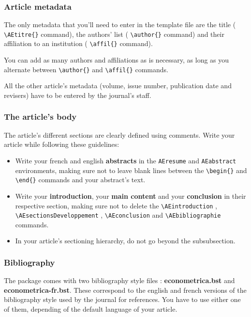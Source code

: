 \documentclass[english]{article}
\newcommand{\cmd}[1]{%
	\texttt{\textbackslash#1\{\}}
}
\newcommand{\dec}[1]{%
	\texttt{\textbackslash#1}
}
\begin{document}
			\subsubsection{Article metadata}
			
				The only metadata that you'll need to enter in the template file are the title
				(\cmd{AEtitre} command), the authors' list (\cmd{author} command)
				and their affiliation to an institution (\cmd{affil} command).
				
				You can add as many authors and affiliations as is necessary, as long as you alternate
				between \cmd{author} and \cmd{affil} commands.
				
				All the other article's metadata (volume, issue number, publication date and revisers) have
				to be entered by the journal's staff.
				
			\subsubsection{The article's body}
			
				The article's different sections are clearly defined using comments. Write your article
				while following these guidelines:
				
				\begin{itemize}
					\item Write your french and english \textbf{abstracts} in the \texttt{AEresume} and
						\texttt{AEabstract} environments, making sure not to leave blank lines between
						the \cmd{begin} and \cmd{end} commands and your abstract's text.
					\item Write your \textbf{introduction}, your \textbf{main content} and your \textbf{conclusion} 
						in their respective section, making sure not to delete the \dec{AEintroduction},
						\dec{AEsectionsDeveloppement}, \dec{AEconclusion} and \dec{AEbibliographie} commands.
					\item In your article's sectioning hierarchy, do not go beyond the subsubsection.
				\end{itemize}
			
			\subsubsection{Bibliography}
			
				The package comes with two bibliography style files : \textbf{econometrica.bst} and 
				\textbf{econometrica-fr.bst}. These correspond to the english and french versions
				of the bibliography style used by the journal for references. You have to use either one
				of them, depending of the default language of your article.
				
\end{document}
